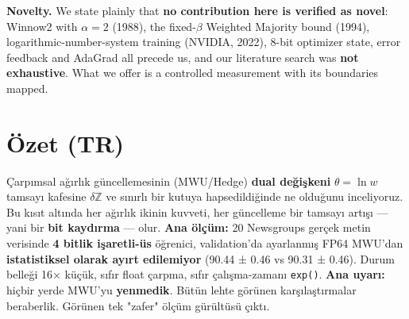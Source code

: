 \documentclass[11pt]{article}
\begin{document}
\textbf{Novelty.} We state plainly that \textbf{no contribution here is verified as novel}: Winnow2 with $\alpha{=}2$ (1988), the fixed-$\beta$ Weighted Majority bound (1994), logarithmic-number-system training (NVIDIA, 2022), 8-bit optimizer state, error feedback and AdaGrad all precede us, and our literature search was \textbf{not exhaustive}. What we offer is a controlled measurement with its boundaries mapped.
\section*{Özet (TR)}
Çarpımsal ağırlık güncellemesinin (MWU/Hedge) \textbf{dual değişkeni} $\theta=\ln w$ tamsayı kafesine $\delta\mathbb{Z}$ ve sınırlı bir kutuya hapsedildiğinde ne olduğunu inceliyoruz. Bu kısıt altında her ağırlık ikinin kuvveti, her güncelleme bir tamsayı artışı — yani bir \textbf{bit kaydırma} — olur.
\textbf{Ana ölçüm:} 20 Newsgroups gerçek metin verisinde \textbf{4 bitlik işaretli-üs} öğrenici, validation'da ayarlanmış FP64 MWU'dan \textbf{istatistiksel olarak ayırt edilemiyor} (90.44 ± 0.46 vs 90.31 ± 0.46). Durum belleği 16× küçük, sıfır float çarpma, sıfır çalışma-zamanı \texttt{exp()}.
\textbf{Ana uyarı:} hiçbir yerde MWU'yu \textbf{yenmedik}. Bütün lehte görünen karşılaştırmalar beraberlik. Görünen tek "zafer" ölçüm gürültüsü çıktı.
\end{document}
